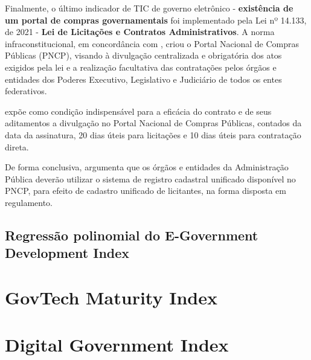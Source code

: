 Finalmente, o último indicador de TIC de governo eletrônico - \textbf{existência de um portal de compras governamentais} foi implementado pela Lei nº 14.133, de 2021 - \textbf{Lei de Licitações e Contratos Administrativos}. A norma infraconstitucional, em concordância com \cite{l14133}, criou o Portal Nacional de Compras Públicas (PNCP), visando à divulgação centralizada e obrigatória dos atos exigidos pela lei e a realização facultativa das contratações pelos órgãos e entidades dos Poderes Executivo, Legislativo e Judiciário de todos os entes federativos.

\cite{l14133} expõe como condição indispensável para a eficácia do contrato e de seus aditamentos a divulgação no Portal Nacional de Compras Públicas, contados da data da assinatura, 20 dias úteis para licitações e 10 dias úteis para contratação direta.

De forma conclusiva, \cite{l14133} argumenta que os órgãos e entidades da Administração Pública deverão utilizar o sistema de registro cadastral unificado disponível no PNCP, para efeito de cadastro unificado de licitantes, na forma disposta em regulamento.
 
\subsection{Regressão polinomial do E-Government Development Index}

\section{GovTech Maturity Index}

\section{Digital Government Index}